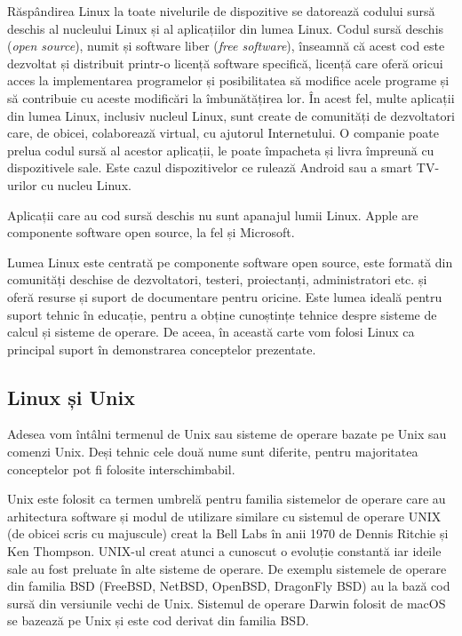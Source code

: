 Răspândirea Linux la toate nivelurile de dispozitive se datorează codului sursă deschis al nucleului Linux și al aplicațiilor din lumea Linux. Codul sursă deschis (\textit{open source}), numit și software liber (\textit{free software}), înseamnă că acest cod este dezvoltat și distribuit printr-o licență software specifică, licență care oferă oricui acces la implementarea programelor și posibilitatea să modifice acele programe și să contribuie cu aceste modificări la îmbunătățirea lor. În acest fel, multe aplicații din lumea Linux, inclusiv nucleul Linux, sunt create de comunități de dezvoltatori care, de obicei, colaborează virtual, cu ajutorul Internetului. O companie poate prelua codul sursă al acestor aplicații, le poate împacheta și livra împreună cu dispozitivele sale. Este cazul dispozitivelor ce rulează Android sau a smart TV-urilor cu nucleu Linux.

Aplicații care au cod sursă deschis nu sunt apanajul lumii Linux. Apple are componente software open source, la fel și Microsoft.

Lumea Linux este centrată pe componente software open source, este formată din comunități deschise de dezvoltatori, testeri, proiectanți, administratori etc. și oferă resurse și suport de documentare pentru oricine. Este lumea ideală pentru suport tehnic în educație, pentru a obține cunoștințe tehnice despre sisteme de calcul și sisteme de operare. De aceea, în această carte vom folosi Linux ca principal suport în demonstrarea conceptelor prezentate.

\subsection{Linux și Unix}
\label{sec:intro:linux-unix}

Adesea vom întâlni termenul de Unix sau sisteme de operare bazate pe Unix sau comenzi Unix. Deși tehnic cele două nume sunt diferite, pentru majoritatea conceptelor pot fi folosite interschimbabil.

Unix este folosit ca termen umbrelă pentru familia sistemelor de operare care au arhitectura software și modul de utilizare similare cu sistemul de operare UNIX (de obicei scris cu majuscule) creat la Bell Labs în anii 1970 de Dennis Ritchie și Ken Thompson. UNIX-ul creat atunci a cunoscut o evoluție constantă iar ideile sale au fost preluate în alte sisteme de operare. De exemplu sistemele de operare din familia BSD (FreeBSD, NetBSD, OpenBSD, DragonFly BSD) au la bază cod sursă din versiunile vechi de Unix. Sistemul de operare Darwin folosit de macOS se bazează pe Unix și este cod derivat din familia BSD.

